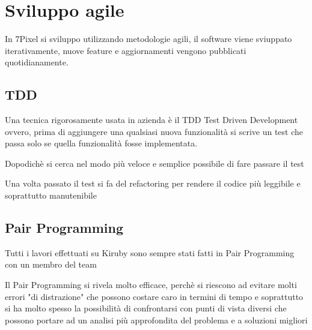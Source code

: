 


\section{Sviluppo agile}
In 7Pixel si sviluppo utilizzando metodologie agili, il software viene sviuppato
iterativamente, nuove feature e aggiornamenti vengono pubblicati quotidianamente.

\subsection{TDD}
Una tecnica rigorosamente usata in azienda è il TDD Test Driven Development ovvero, prima di
aggiungere una qualsiasi nuova funzionalità si scrive un test che passa solo se 
quella funzionalità fosse implementata. 

Dopodichè si cerca nel modo più veloce e semplice possibile di fare passare il test

Una volta passato il test si fa del refactoring per rendere il codice più leggibile
e soprattutto manutenibile

\subsection{Pair Programming}
Tutti i lavori effettuati su Kiruby sono sempre stati fatti in Pair Programming
con un membro del team

Il Pair Programming si rivela molto efficace, perchè si riescono ad evitare molti
errori "di distrazione" che possono costare caro in termini di tempo e soprattutto
si ha molto spesso la possibilità di confrontarsi con punti di vista diversi che possono
portare ad un analisi più approfondita del problema e a soluzioni migliori 

